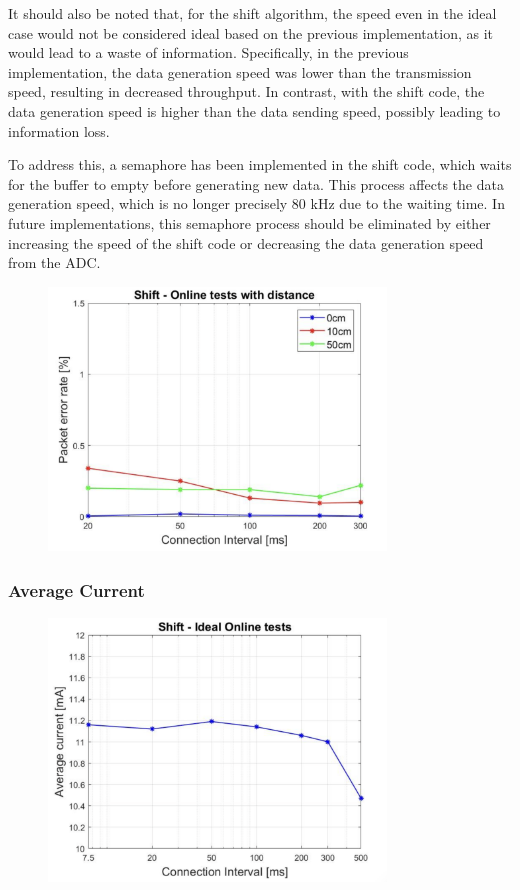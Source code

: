 \documentclass{Configuration_Files/PoliMi3i_thesis}
\begin{document}
It should also be noted that, for the shift algorithm, the speed even in the ideal case would not be considered ideal based on the previous implementation, as it would lead to a waste of information. Specifically, in the previous implementation, the data generation speed was lower than the transmission speed, resulting in decreased throughput. In contrast, with the shift code, the data generation speed is higher than the data sending speed, possibly leading to information loss.

To address this, a semaphore has been implemented in the shift code, which waits for the buffer to empty before generating new data. This process affects the data generation speed, which is no longer precisely 80 kHz due to the waiting time. In future implementations, this semaphore process should be eliminated by either increasing the speed of the shift code or decreasing the data generation speed from the ADC.

\begin{figure}[h!]
    \centering
    \includegraphics[width=0.8\textwidth]{Results Manuel/figure18}
    \label{fig:figure1}
\end{figure}

\subsubsection*{Average Current}

\begin{figure}[h!]
    \centering
    \includegraphics[width=0.8\textwidth]{Results Manuel/figure19}
    \label{fig:figure1}
\end{figure}
\end{document}
